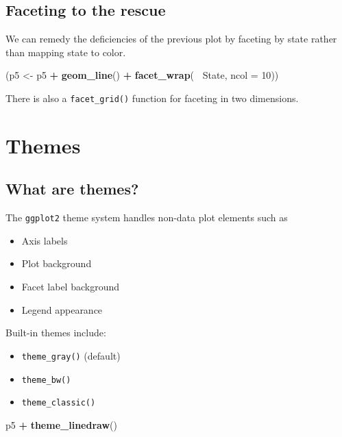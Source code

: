 \documentclass[]{book}
\newenvironment{Shaded}{\begin{snugshade}}{\end{snugshade}}
\newcommand{\KeywordTok}[1]{\textcolor[rgb]{0.13,0.29,0.53}{\textbf{#1}}}
\newcommand{\DataTypeTok}[1]{\textcolor[rgb]{0.13,0.29,0.53}{#1}}
\newcommand{\DecValTok}[1]{\textcolor[rgb]{0.00,0.00,0.81}{#1}}
\newcommand{\StringTok}[1]{\textcolor[rgb]{0.31,0.60,0.02}{#1}}
\newcommand{\OperatorTok}[1]{\textcolor[rgb]{0.81,0.36,0.00}{\textbf{#1}}}
\newcommand{\NormalTok}[1]{#1}
\providecommand{\tightlist}{%
  \setlength{\itemsep}{0pt}\setlength{\parskip}{0pt}}
\begin{document}
\subsection{Faceting to the rescue}\label{faceting-to-the-rescue}

We can remedy the deficiencies of the previous plot by faceting by state
rather than mapping state to color.

\begin{Shaded}
\begin{Highlighting}[]
\NormalTok{(p5 <-}\StringTok{ }\NormalTok{p5 }\OperatorTok{+}\StringTok{ }\KeywordTok{geom_line}\NormalTok{() }\OperatorTok{+}
\StringTok{   }\KeywordTok{facet_wrap}\NormalTok{(}\OperatorTok{~}\StringTok{ }\NormalTok{State, }\DataTypeTok{ncol =} \DecValTok{10}\NormalTok{))}
\end{Highlighting}
\end{Shaded}

There is also a \texttt{facet\_grid()} function for faceting in two
dimensions.

\section{Themes}\label{themes}

\subsection{What are themes?}\label{what-are-themes}

The \texttt{ggplot2} theme system handles non-data plot elements such as

\begin{itemize}
\tightlist
\item
  Axis labels
\item
  Plot background
\item
  Facet label background
\item
  Legend appearance
\end{itemize}

Built-in themes include:

\begin{itemize}
\tightlist
\item
  \texttt{theme\_gray()} (default)
\item
  \texttt{theme\_bw()}
\item
  \texttt{theme\_classic()}
\end{itemize}

\begin{Shaded}
\begin{Highlighting}[]
\NormalTok{p5 }\OperatorTok{+}\StringTok{ }\KeywordTok{theme_linedraw}\NormalTok{()}
\end{Highlighting}
\end{Shaded}
\end{document}
